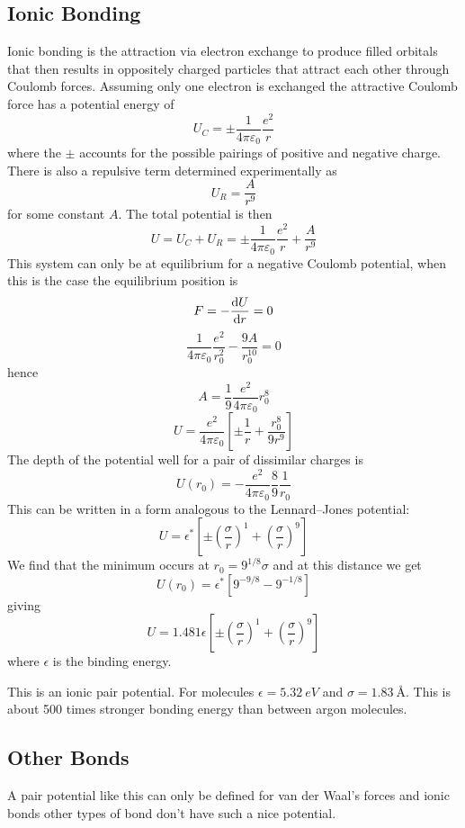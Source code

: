     \subsection{Ionic Bonding}
    Ionic bonding is the attraction via electron exchange to produce filled orbitals that then results in oppositely charged particles that attract each other through Coulomb forces.
    Assuming only one electron is exchanged the attractive Coulomb force has a potential energy of
    \[U_C = \pm\frac{1}{4\pi\varepsilon_0}\frac{e^2}{r}\]
    where the \(\pm\) accounts for the possible pairings of positive and negative charge.
    There is also a repulsive term determined experimentally as
    \[U_R = \frac{A}{r^9}\]
    for some constant \(A\).
    The total potential is then
    \[U = U_C + U_R = \pm\frac{1}{4\pi\varepsilon_0}\frac{e^2}{r} + \frac{A}{r^9}\]
    This system can only be at equilibrium for a negative Coulomb potential, when this is the case the equilibrium position is
    \[F = -\dv{U}{r} = 0\]
    \[\frac{1}{4\pi\varepsilon_0}\frac{e^2}{r_0^2} - \frac{9A}{r_0^10} = 0\]
    hence
    \[A = \frac{1}{9}\frac{e^2}{4\pi\varepsilon_0}r_0^8\]
    \[U = \frac{e^2}{4\pi\varepsilon_0}\left[\pm\frac{1}{r} + \frac{r_0^8}{9r^9}\right]\]
    The depth of the potential well for a pair of dissimilar charges is
    \[U(r_0) = -\frac{e^2}{4\pi\varepsilon_0}\frac{8}{9}\frac{1}{r_0}\]
    This can be written in a form analogous to the Lennard--Jones potential:
    \[U = \epsilon^*\left[\pm\left(\frac{\sigma}{r}\right)^1 + \left(\frac{\sigma}{r}\right)^9\right]\]
    We find that the minimum occurs at \(r_0 = 9^{1/8}\sigma\) and at this distance we get
    \[U(r_0) = \epsilon^*\left[9^{-9/8} - 9^{-1/8}\right]\]
    giving
    \begin{equation}\label{eqn:ionic potential}
        U = 1.481\epsilon\left[\pm\left(\frac{\sigma}{r}\right)^1 + \left(\frac{\sigma}{r}\right)^9\right]
    \end{equation}
    where \(\epsilon\) is the binding energy.
    
    This is an ionic pair potential.
    For  molecules \(\epsilon = \SI{5.32}{eV}\) and \(\sigma = \SI{1.83}{\angstrom}\).
    This is about 500 times stronger bonding energy than between argon molecules.
    
    \subsection{Other Bonds}
    A pair potential like this can only be defined for van der Waal's forces and ionic bonds other types of bond don't have such a nice potential.
    
